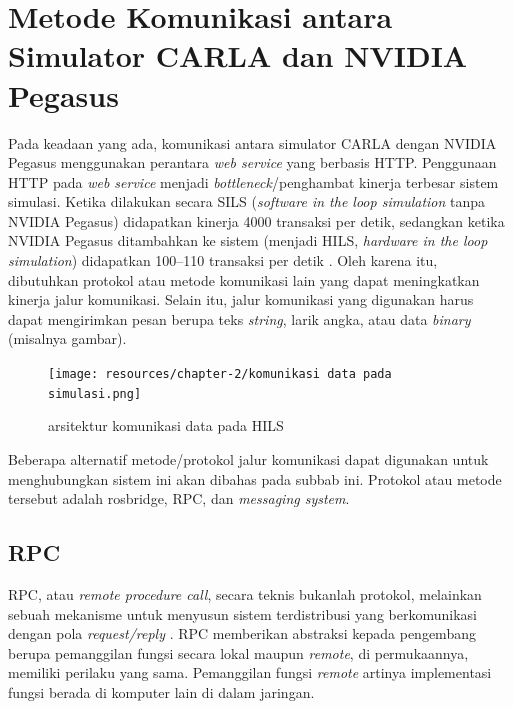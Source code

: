 \section{Metode Komunikasi antara Simulator CARLA dan NVI\-DI\-A Pegasus}

Pada keadaan yang ada, komunikasi antara simulator CARLA dengan NVIDIA Pegasus
menggunakan perantara \textit{web service} yang berbasis HTTP. Penggunaan HTTP
pada \textit{web service} menjadi \textit{bottleneck}/penghambat kinerja
terbesar sistem simulasi. Ketika dilakukan secara SILS (\textit{software in the
    loop simulation} tanpa NVIDIA Pegasus) didapatkan kinerja 4000 transaksi per
detik, sedangkan ketika NVIDIA Pegasus ditambahkan ke sistem (menjadi HILS,
\textit{hardware in the loop simulation}) didapatkan 100--110 transaksi per
detik \parencite{trilaksono_laporanRispro}. Oleh karena itu, dibutuhkan protokol
atau metode komunikasi lain yang dapat meningkatkan kinerja jalur komunikasi.
Selain itu, jalur komunikasi yang digunakan harus dapat mengirimkan pesan berupa
teks \textit{string}, larik angka, atau data \textit{binary} (misalnya gambar).

\begin{figure}
    \begin{center}
        \texttt{[image: resources/chapter-2/komunikasi
            data pada simulasi.png]}
        \caption{arsitektur komunikasi data pada HILS
            \parencite{trilaksono_laporanRispro}}
    \end{center}
\end{figure}

Beberapa alternatif metode/protokol jalur komunikasi dapat digunakan untuk
meng\-hu\-bung\-kan sistem ini akan dibahas pada subbab ini. Protokol atau
metode tersebut adalah rosbridge, RPC, dan \textit{messaging system}.

\subsection{RPC}

RPC, atau \textit{remote procedure call}, secara teknis bukanlah protokol,
melainkan sebuah mekanisme untuk menyusun sistem terdistribusi yang
berkomunikasi dengan pola \textit{request/reply}
\parencite{larry_computerNetwork}. RPC memberikan abstraksi kepada pengembang
berupa pemanggilan fungsi secara lokal maupun \textit{remote}, di permukaannya,
memiliki perilaku yang sama. Pemanggilan fungsi \textit{remote} artinya
implementasi fungsi berada di komputer lain di dalam jaringan.


